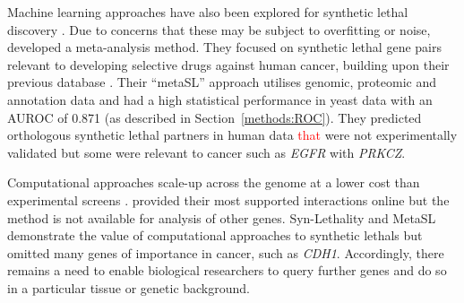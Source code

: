 Machine learning approaches have also been explored for \gls{synthetic lethal} discovery \citep{Babyak2004, Lee2009}. Due to concerns that these may be subject to overfitting or noise, \citet{Wu2014} developed a meta-analysis method. %
They focused on \gls{synthetic lethal} gene pairs relevant to developing selective drugs against human cancer, building upon their previous database \citep{Li2014}. %
Their ``metaSL'' approach utilises \gls{genomic}, proteomic and annotation data %
and had a high statistical performance in yeast data with an \gls{AUROC} of 0.871 (as described in Section~\ref{methods:ROC}). They predicted orthologous \gls{synthetic lethal} partners in human data \textcolor{red}{that} were not experimentally validated but some were relevant to cancer such as \textit{EGFR} with \textit{PRKCZ}.

Computational approaches scale-up across the \gls{genome} at a lower cost than experimental screens \citep{Wu2014}. \citet{Wu2014} provided their most supported interactions online but the method is not available for analysis of other genes.  %
Syn-Lethality \citep{Li2014} and MetaSL \citep{Wu2014} demonstrate the value of computational approaches to \glspl{synthetic lethal} but omitted many genes of importance in cancer, such as \textit{CDH1}. Accordingly, there remains a need to enable biological researchers to query further genes and do so in a particular tissue or genetic background. 

